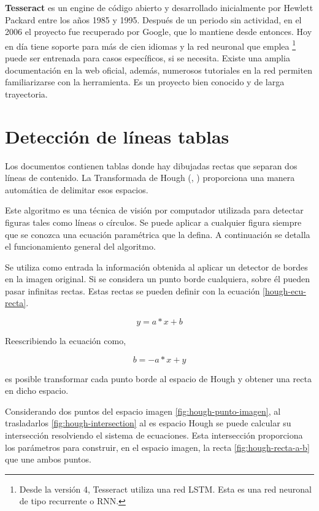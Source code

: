 \textbf{Tesseract} \cite{ocr_tesseract_smith_paper} es un engine de código abierto y desarrollado inicialmente por Hewlett Packard \cite{ocr_tesseract_v4_release_notes} entre los años 1985 y 1995. Después de un periodo sin actividad, en el 2006 el proyecto fue recuperado por Google, que lo mantiene desde entonces. Hoy en día tiene soporte para más de cien idiomas y la red neuronal que emplea \footnote{Desde la versión 4, Tesseract utiliza una red LSTM. Esta es una red neuronal de tipo recurrente o RNN.} puede ser entrenada para casos específicos, si se necesita. Existe una amplia documentación en la web oficial, además, numerosos tutoriales en la red permiten familiarizarse con la herramienta. Es un proyecto bien conocido y de larga trayectoria.

\section{Detección de líneas tablas}

Los documentos contienen tablas donde hay dibujadas rectas que separan dos líneas de contenido. La Transformada de Hough (\cite{hough_krishna_computerVision}, \cite{hough_grauman_presentation}) proporciona una manera automática de delimitar esos espacios.

Este algoritmo es una técnica de visión por computador utilizada para detectar figuras tales como líneas o círculos. Se puede aplicar a cualquier figura siempre que se conozca una ecuación paramétrica que la defina. A continuación se detalla el funcionamiento general del algoritmo.

Se utiliza como entrada la información obtenida al aplicar un detector de bordes en la imagen original. Si se considera un punto borde cualquiera, sobre él pueden pasar infinitas rectas. Estas rectas se pueden definir con la ecuación \ref{hough-ecu-recta}.

\begin{equation}
    \label{hough-ecu-recta}
    y = a*x + b
\end{equation}

Reescribiendo la ecuación como,

\begin{equation}
b = -a*x + y
\end{equation}

es posible transformar cada punto borde al espacio de Hough y obtener una recta en dicho espacio.

Considerando dos puntos del espacio imagen \ref{fig:hough-punto-imagen}, al trasladarlos \ref{fig:hough-intersection} al es espacio Hough se puede calcular su intersección resolviendo el sistema de ecuaciones. Esta intersección proporciona los parámetros para construir, en el espacio imagen, la recta \ref{fig:hough-recta-a-b} que une ambos puntos.

